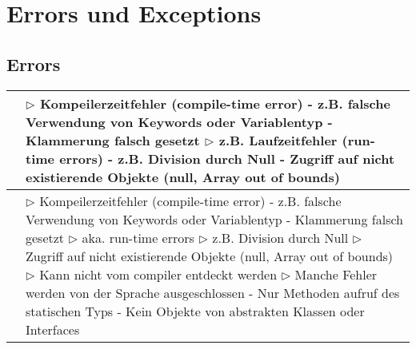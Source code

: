 \section{Errors und Exceptions}

\subsection{Errors}

	\begin{table}[H]
	\label{Errors}
	\begin{tabular}{ | p{4cm} p{13.5cm} | }


	\hline
	\makecell[l]{Arten} & 
	\makecell[l]
	{
	$\rhd$ Kompeilerzeitfehler (compile-time error) \\
	\hspace{0.5cm} - z.B. falsche Verwendung von Keywords oder 
	Variablentyp \\
	\hspace{0.5cm} - Klammerung falsch gesetzt \\
	$\rhd$ z.B. Laufzeitfehler (run-time errors) \\
	\hspace{0.5cm} - z.B. Division durch Null \\
	\hspace{0.5cm} - Zugriff auf nicht existierende Objekte (null, Array 
	out of bounds) \\
	} 	\\ \hline


	\makecell[l]{Laufzeitfehler} & 
	\makecell[l]
	{
	$\rhd$ Kompeilerzeitfehler (compile-time error) \\
	\hspace{0.5cm} - z.B. falsche Verwendung von Keywords oder 
	Variablentyp \\
	\hspace{0.5cm} - Klammerung falsch gesetzt \\
	$\rhd$ aka. run-time errors \\
	$\rhd$ z.B. Division durch Null \\
	$\rhd$ Zugriff auf nicht existierende Objekte (null, Array 
	out of bounds) \\
	$\rhd$ Kann nicht vom compiler entdeckt werden \\
	$\rhd$ Manche Fehler werden von der Sprache ausgeschlossen \\
	\hspace{0.4cm} - Nur Methoden aufruf des statischen Typs \\ 
	\hspace{0.4cm} - Kein Objekte von abstrakten Klassen oder Interfaces \\	
	} 	\\ \hline



\end{tabular}
\end{table}
